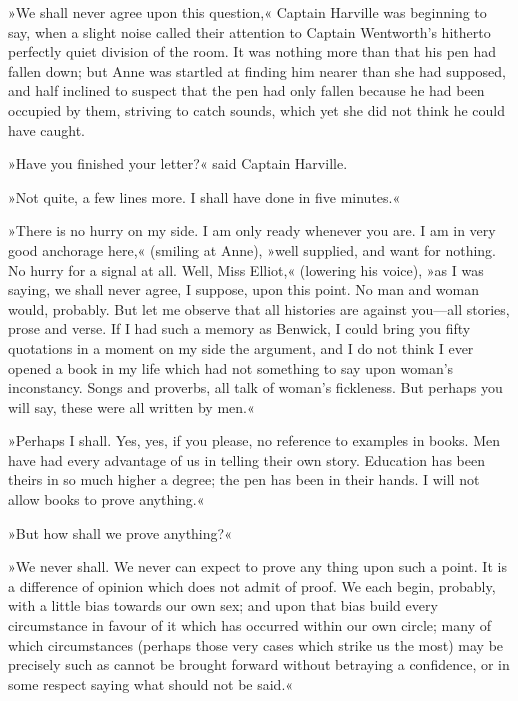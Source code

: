 »We shall never agree upon this question,« Captain Harville was beginning to say, when a slight noise called their attention to Captain Wentworth's hitherto perfectly quiet division of the room. It was nothing more than that his pen had fallen down; but Anne was startled at finding him nearer than she had supposed, and half inclined to suspect that the pen had only fallen because he had been occupied by them, striving to catch sounds, which yet she did not think he could have caught.

»Have you finished your letter?« said Captain Harville.

»Not quite, a few lines more. I shall have done in five minutes.«

»There is no hurry on my side. I am only ready whenever you are. I am in very good anchorage here,« (smiling at Anne), »well supplied, and want for nothing. No hurry for a signal at all. Well, Miss Elliot,« (lowering his voice), »as I was saying, we shall never agree, I suppose, upon this point. No man and woman would, probably. But let me observe that all histories are against you—all stories, prose and verse. If I had such a memory as Benwick, I could bring you fifty quotations in a moment on my side the argument, and I do not think I ever opened a book in my life which had not something to say upon woman's inconstancy. Songs and proverbs, all talk of woman's fickleness. But perhaps you will say, these were all written by men.«

»Perhaps I shall. Yes, yes, if you please, no reference to examples in books. Men have had every advantage of us in telling their own story. Education has been theirs in so much higher a degree; the pen has been in their hands. I will not allow books to prove anything.«

»But how shall we prove anything?«

»We never shall. We never can expect to prove any thing upon such a point. It is a difference of opinion which does not admit of proof. We each begin, probably, with a little bias towards our own sex; and upon that bias build every circumstance in favour of it which has occurred within our own circle; many of which circumstances (perhaps those very cases which strike us the most) may be precisely such as cannot be brought forward without betraying a confidence, or in some respect saying what should not be said.«

